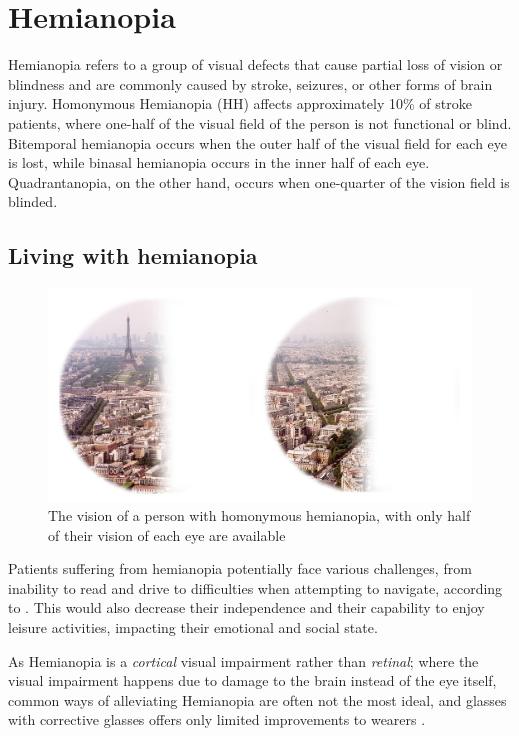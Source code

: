 \documentclass{l4proj}
\begin{document}
\section{Hemianopia}
Hemianopia refers to a group of visual defects that cause partial loss of vision or blindness and are commonly caused by stroke, seizures, or other forms of brain injury. Homonymous Hemianopia (HH) affects approximately 10\% of stroke patients, where one-half of the visual field of the person is not functional or blind. Bitemporal hemianopia occurs when the outer half of the visual field for each eye is lost, while binasal hemianopia occurs in the inner half of each eye. Quadrantanopia, on the other hand, occurs when one-quarter of the vision field is blinded.

\subsection{Living with hemianopia}
\begin{figure}
    \centering
    \includegraphics[width=0.7\linewidth]{images/hemianopia paris.png}
    \caption{The vision of a person with homonymous hemianopia, with only half of their vision of each eye are available}
    \label{fig:hemianopiaView}
\end{figure}

Patients suffering from hemianopia potentially face various challenges, from inability to read and drive to difficulties when attempting to navigate, according to \cite{Goodwin2014}. This would also decrease their independence and their capability to enjoy leisure activities, impacting their emotional and social state.

As Hemianopia is a \textit{cortical} visual impairment rather than \textit{retinal}; where the visual impairment happens due to damage to the brain instead of the eye itself, common ways of alleviating Hemianopia are often not the most ideal, and glasses with corrective glasses offers only limited improvements to wearers \cite{Bowers2008Community-BasedHemianopia}.
\end{document}
